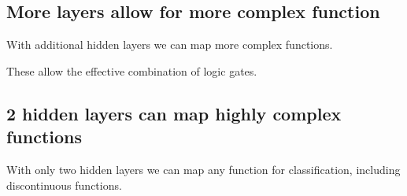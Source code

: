
\subsection{More layers allow for more complex function}

With additional hidden layers we can map more complex functions.

These allow the effective combination of logic gates.

\subsection{2 hidden layers can map highly complex functions}

With only two hidden layers we can map any function for classification, including discontinuous functions.
